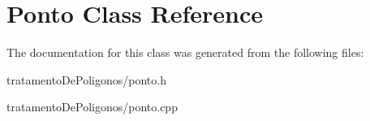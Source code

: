 \hypertarget{class_ponto}{}\section{Ponto Class Reference}
\label{class_ponto}


The documentation for this class was generated from the following files\+:\begin{DoxyCompactItemize}
\item 
tratamento\+De\+Poligonos/ponto.\+h\item 
tratamento\+De\+Poligonos/ponto.\+cpp\end{DoxyCompactItemize}
